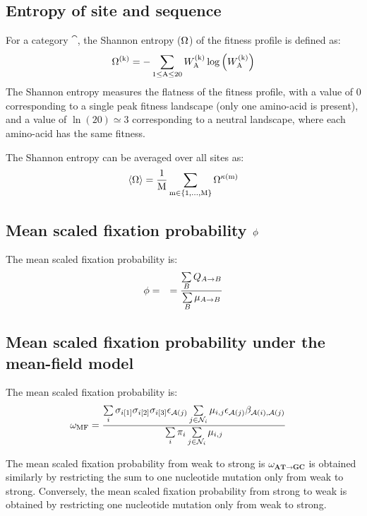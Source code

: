 \subsection{Entropy of site and sequence}
\label{subsec:entropy}

For a category $\cat$, the Shannon entropy (${\Omega}$) of the fitness profile is defined as:
\begin{equation}
    {\Omega}^{(\text{k})} = - \sum\limits_{1 \leq \text{A} \leq 20} W^{(\text{k})}_{\text{A}} \log \left( W^{(\text{k})}_{\text{A}} \right)
\end{equation}
The Shannon entropy measures the flatness of the fitness profile, with a value of $0$ corresponding to a single peak fitness landscape (only one amino-acid is present), and a value of $\ln(20)\simeq3$ corresponding to a neutral landscape, where each amino-acid has the same fitness.

The Shannon entropy can be averaged over all sites as:
\begin{equation}
    \langle {\Omega} \rangle = \dfrac{1}{\text{M}}\sum\limits_{\text{m} \in \{1, \hdots, \text{M}\}} {\Omega}^{\kappa\left(\text{m}\right)}
\end{equation}

\subsection{Mean scaled fixation probability \texorpdfstring{$\phi$}{φ}}
\label{subsec:fixation-bias}
The mean scaled fixation probability is:
\begin{align}
    \phi & = & = \dfrac{ \sum\limits_{B} Q_{A \to B}}{ \sum\limits_{B} \mu_{A \to B}}
\end{align}

\subsection{Mean scaled fixation probability under the mean-field model}
\label{sec-mut-bias:mean-field-omega}

The mean scaled fixation probability is:
\begin{align}
    \omega_{\text{MF}} & = \dfrac{ \sum\limits_{i} \sigma_{{i}[1]}\sigma_{{i}[2]}\sigma_{{i}[3]} \epsilon_{\mathcal{A}({j})} \sum\limits_{j \in \mathcal{N}_{{i}}} \mu_{{i}, {j}} \epsilon_{\mathcal{A}({j})} \beta_{\mathcal{A}({i}), \mathcal{A}({j})} }{\sum\limits_{i} \pi_{i} \sum\limits_{j \in \mathcal{N}_{{i}} } \mu_{{i}, {j}}}
\end{align}

The mean scaled fixation probability from weak to strong is $\omega_{\textbf{AT} \rightarrow \textbf{GC}}$ is obtained similarly by restricting the sum to one nucleotide mutation only from weak to strong.
Conversely, the mean scaled fixation probability from strong to weak is obtained by restricting one nucleotide mutation only from weak to strong.

